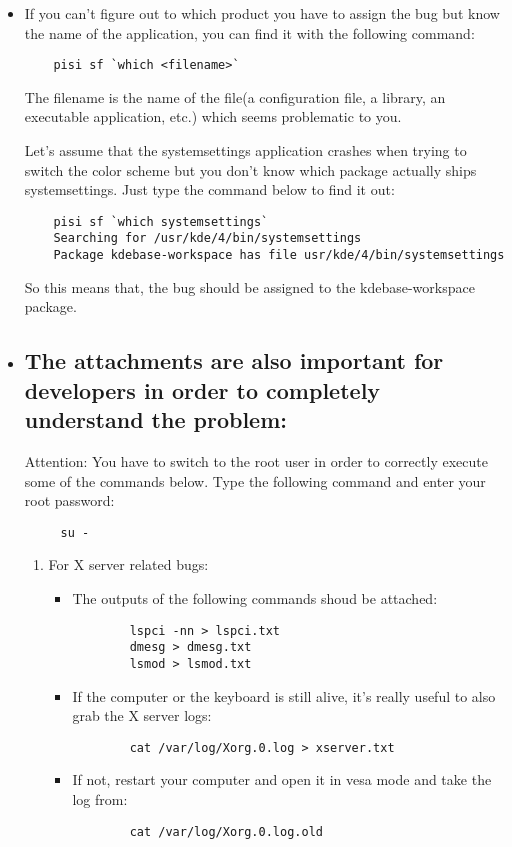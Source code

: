\documentclass[a4paper,10pt]{article}
\begin{document}
\begin{itemize}
  	\item If you can't figure out to which product you have to assign the bug but know the name of the application, you can find it with the following command:
	\begin{verbatim}
	pisi sf `which <filename>`
	\end{verbatim}
	The filename is the name of the file(a configuration file, a library, an executable application, etc.) which seems problematic to you.

	Let's assume that the systemsettings application crashes when trying to switch the color scheme but you don't know which package actually ships systemsettings. Just type the command below to find it out:
	\begin{verbatim}
	pisi sf `which systemsettings`
	Searching for /usr/kde/4/bin/systemsettings
	Package kdebase-workspace has file usr/kde/4/bin/systemsettings
	\end{verbatim}
	So this means that, the bug should be assigned to the kdebase-workspace package.

  \item \subsection*{The attachments are also important for developers in order to completely understand the problem:}

	Attention: You have to switch to the root user in order to correctly execute some of the commands below. Type the following command and enter your root password:
	\begin{verbatim}
	 su -
	\end{verbatim}

	\begin{enumerate}
	\item For X server related bugs:
	\begin{itemize}
		\item The outputs of the following commands shoud be attached:
		\begin{verbatim}
		lspci -nn > lspci.txt
		dmesg > dmesg.txt
		lsmod > lsmod.txt
		\end{verbatim}
		\item If the computer or the keyboard is still alive, it's really useful to also grab the X server logs:
		\begin{verbatim}
		cat /var/log/Xorg.0.log > xserver.txt
		\end{verbatim}
		\item If not, restart your computer and open it in vesa mode and take the log from:
		\begin{verbatim}
		cat /var/log/Xorg.0.log.old
		\end{verbatim}


\end{itemize}
\end{enumerate}
\end{itemize}
\end{document}

